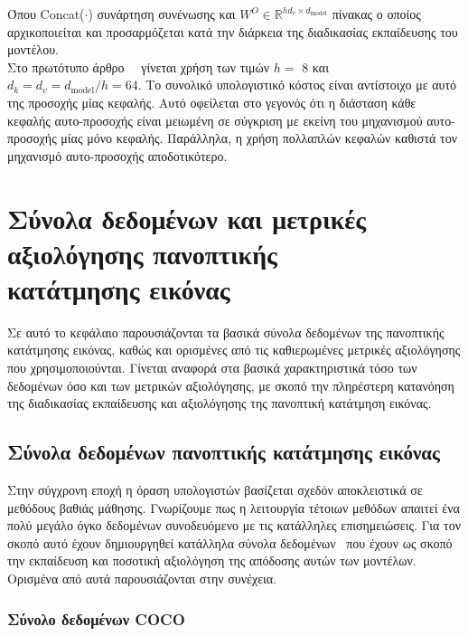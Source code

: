 \documentclass[12pt]{article}
\numberwithin{equation}{section}
\begin{document}
\noindent Όπου Concat(\(\cdot\)) συνάρτηση συνένωσης και \( W^O \in \mathbb{R}^{h d_v \times d_{\text{model}}} \) πίνακας ο οποίος αρχικοποιείται και προσαρμόζεται κατά την διάρκεια της διαδικασίας εκπαίδευσης του μοντέλου.\\

Στο πρωτότυπο άρθρο~\cite{vaswani2023attentionneed}~ γίνεται χρήση των τιμών \(h =\) 8 και \( d_k = d_v = d_{\text{model}} / h = 64 \). Το συνολικό υπολογιστικό κόστος είναι αντίστοιχο με αυτό της προσοχής μίας κεφαλής. Αυτό οφείλεται στο γεγονός ότι η διάσταση κάθε κεφαλής  αυτο-προσοχής είναι μειωμένη σε σύγκριση με εκείνη του μηχανισμού αυτο-προσοχής μίας μόνο κεφαλής. Παράλληλα, η χρήση πολλαπλών κεφαλών καθιστά τον μηχανισμό αυτο-προσοχής αποδοτικότερο. \\



\newpage
\mbox{}
\newpage

\section{Σύνολα δεδομένων και μετρικές αξιολόγησης πανοπτικής \\ κατάτμησης εικόνας}

Σε αυτό το κεφάλαιο παρουσιάζονται τα βασικά σύνολα δεδομένων της πανοπτικής κατάτμησης εικόνας, καθώς και ορισμένες από τις καθιερωμένες μετρικές αξιολόγησης που χρησιμοποιούνται. Γίνεται αναφορά στα βασικά χαρακτηριστικά τόσο των δεδομένων όσο και των μετρικών αξιολόγησης, με σκοπό την πληρέστερη κατανόηση της διαδικασίας εκπαίδευσης και αξιολόγησης της πανοπτική κατάτμηση εικόνας. \\

\subsection{Σύνολα δεδομένων πανοπτικής κατάτμησης εικόνας}

Στην σύγχρονη εποχή η όραση υπολογιστών βασίζεται σχεδόν αποκλειστικά σε μεθόδους βαθιάς μάθησης. Γνωρίζουμε πως η λειτουργία τέτοιων μεθόδων απαιτεί ένα πολύ μεγάλο όγκο δεδομένων συνοδευόμενο με τις κατάλληλες επισημειώσεις. Για τον σκοπό αυτό έχουν δημιουργηθεί κατάλληλα σύνολα δεδομένων~\cite{article2} που έχουν ως σκοπό την εκπαίδευση και ποσοτική αξιολόγηση της απόδοσης αυτών των μοντέλων. Ορισμένα από αυτά παρουσιάζονται στην συνέχεια.

\subsubsection{Σύνολο δεδομένων COCO}
\end{document}
